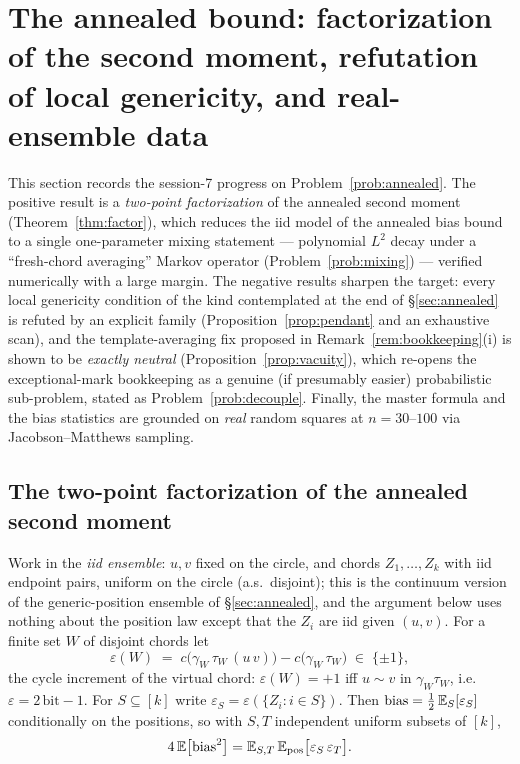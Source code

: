 \section{The annealed bound: factorization of the second moment,
refutation of local genericity, and real-ensemble data}
\label{sec:anneal}

This section records the session-7 progress on
Problem~\ref{prob:annealed}.  The positive result is a
\emph{two-point factorization} of the annealed second moment
(Theorem~\ref{thm:factor}), which reduces the iid model of the
annealed bias bound to a single one-parameter mixing statement ---
polynomial $L^2$ decay under a ``fresh-chord averaging'' Markov
operator (Problem~\ref{prob:mixing}) --- verified numerically with a
large margin.  The negative results sharpen the target: every local
genericity condition of the kind contemplated at the end of
\S\ref{sec:annealed} is refuted by an explicit family
(Proposition~\ref{prop:pendant} and an exhaustive scan), and the
template-averaging fix proposed in Remark~\ref{rem:bookkeeping}(i) is
shown to be \emph{exactly neutral} (Proposition~\ref{prop:vacuity}),
which re-opens the exceptional-mark bookkeeping as a genuine (if
presumably easier) probabilistic sub-problem, stated as
Problem~\ref{prob:decouple}.  Finally, the master formula and the
bias statistics are grounded on \emph{real} random squares at
$n=30$--$100$ via Jacobson--Matthews sampling.

\subsection{The two-point factorization of the annealed second
moment}\label{sec:factor}

Work in the \emph{iid ensemble}: $u,v$ fixed on the circle, and
chords $Z_1,\dots,Z_k$ with iid endpoint pairs, uniform on the circle
(a.s.\ disjoint); this is the continuum version of the
generic-position ensemble of \S\ref{sec:annealed}, and the argument
below uses nothing about the position law except that the $Z_i$ are
iid given $(u,v)$.  For a finite set $W$ of disjoint chords let
\[
\varepsilon(W)\;=\;c\bigl(\gamma_W\,\tau_W\,(u\,v)\bigr)
-c\bigl(\gamma_W\,\tau_W\bigr)\;\in\;\{\pm1\},
\]
the cycle increment of the virtual chord: $\varepsilon(W)=+1$ iff
$u\sim v$ in $\gamma_W\tau_W$, i.e.\ $\varepsilon=2\,\mathrm{bit}-1$.
For $S\subseteq[k]$ write $\varepsilon_S=\varepsilon(\{Z_i:i\in S\})$.
Then $\mathrm{bias}=\tfrac12\,\mathbb{E}_S[\varepsilon_S]$ conditionally on
the positions, so with $S,T$ independent uniform subsets of $[k]$,
\begin{equation}\label{eq:bias2}
4\,\mathbb{E}\bigl[\mathrm{bias}^2\bigr]
=\mathbb{E}_{S,T}\,\mathbb{E}_{\mathrm{pos}}\bigl[\varepsilon_S\,\varepsilon_T\bigr].
\end{equation}

